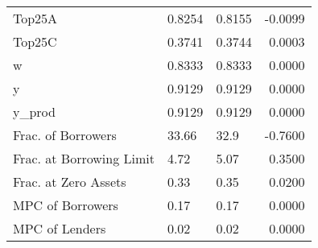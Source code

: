 \begin{table}
\begin{tabular}{lllr}
                  Top25A &  0.8254 &   0.8155 & -0.0099 \\
                  Top25C &  0.3741 &   0.3744 &  0.0003 \\
                       w &  0.8333 &   0.8333 &  0.0000 \\
                       y &  0.9129 &   0.9129 &  0.0000 \\
                  y\_prod &  0.9129 &   0.9129 &  0.0000 \\
      Frac. of Borrowers &   33.66 &     32.9 & -0.7600 \\
Frac. at Borrowing Limit &    4.72 &     5.07 &  0.3500 \\
    Frac. at Zero Assets &    0.33 &     0.35 &  0.0200 \\
        MPC of Borrowers &    0.17 &     0.17 &  0.0000 \\
          MPC of Lenders &    0.02 &     0.02 &  0.0000 \\
\bottomrule
\end{tabular}
\end{table}

